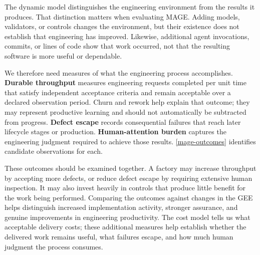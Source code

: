 The dynamic model distinguishes the engineering environment from the results it produces. That distinction matters when evaluating MAGE. Adding models, validators, or controls changes the environment, but their existence does not establish that engineering has improved. Likewise, additional agent invocations, commits, or lines of code show that work occurred, not that the resulting software is more useful or dependable.

We therefore need measures of what the engineering process accomplishes. \textbf{Durable throughput} measures engineering requests completed per unit time that satisfy independent acceptance criteria and remain acceptable over a declared observation period. Churn and rework help explain that outcome; they may represent productive learning and should not automatically be subtracted from progress. \textbf{Defect escape} records consequential failures that reach later lifecycle stages or production. \textbf{Human-attention burden} captures the engineering judgment required to achieve those results. \autoref{mage-outcomes} identifies candidate observations for each.

These outcomes should be examined together. A factory may increase throughput by accepting more defects, or reduce defect escape by requiring extensive human inspection. It may also invest heavily in controls that produce little benefit for the work being performed. Comparing the outcomes against changes in the GEE helps distinguish increased implementation activity, stronger assurance, and genuine improvements in engineering productivity. The cost model tells us what acceptable delivery costs; these additional measures help establish whether the delivered work remains useful, what failures escape, and how much human judgment the process consumes.

